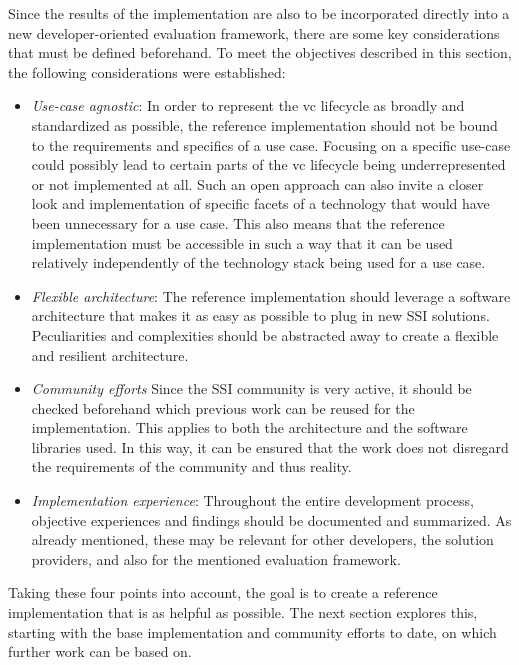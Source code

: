     Since the results of the implementation are also to be incorporated directly into a new developer-oriented evaluation framework, there are some key considerations that must be defined beforehand. To meet the objectives described in this section, the following considerations were established:
    \begin{itemize}
        \item \textit{Use-case agnostic}: In order to represent the \ac{vc} lifecycle as broadly and standardized as possible, the reference implementation should not be bound to the requirements and specifics of a use case. Focusing on a specific use-case could possibly lead to certain parts of the \ac{vc} lifecycle being underrepresented or not implemented at all. Such an open approach can also invite a closer look and implementation of specific facets of a technology that would have been unnecessary for a use case. This also means that the reference implementation must be accessible in such a way that it can be used relatively independently of the technology stack being used for a use case.
        \item \textit{Flexible architecture}: The reference implementation should leverage a software architecture that makes it as easy as possible to plug in new \ac{SSI} solutions. Peculiarities and complexities should be abstracted away to create a flexible and resilient architecture. 
        \item \textit{Community efforts} Since the \ac{SSI} community is very active, it should be checked beforehand which previous work can be reused for the implementation. This applies to both the architecture and the software libraries used. In this way, it can be ensured that the work does not disregard the requirements of the community and thus reality.
        \item \textit{Implementation experience}: Throughout the entire development process, objective experiences and findings should be documented and summarized. As already mentioned, these may be relevant for other developers, the solution providers, and also for the mentioned evaluation framework.
    \end{itemize}
    
    Taking these four points into account, the goal is to create a reference implementation that is as helpful as possible. The next section explores this, starting with the base implementation and community efforts to date, on which further work can be based on.
    
